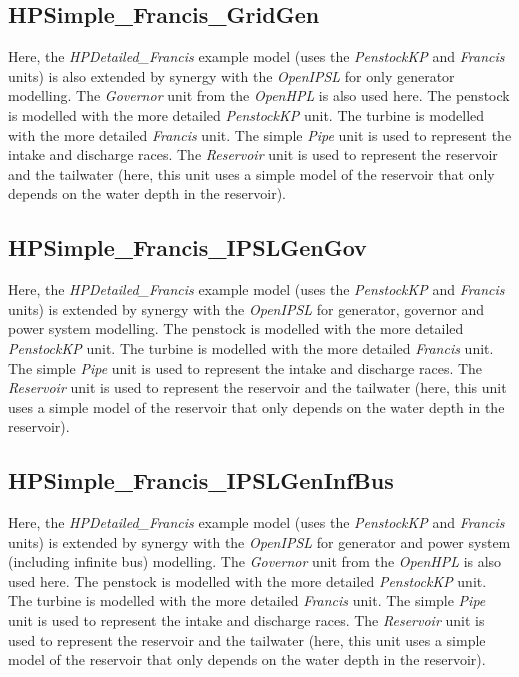 \documentclass[%
]{USN-PhD}
\begin{document}
\subsection{HPSimple\_Francis\_GridGen}

Here, the \emph{HPDetailed\_Francis} example model (uses the \emph{PenstockKP} and \emph{Francis} units) is also extended by synergy with the \emph{OpenIPSL} for only generator modelling. The \emph{Governor} unit from the \emph{OpenHPL} is also used here. The penstock is modelled with the more detailed \emph{PenstockKP} unit. The turbine is modelled with the more detailed \emph{Francis} unit. The simple \emph{Pipe} unit is used to represent the intake and discharge races. The \emph{Reservoir} unit is used to represent the reservoir and the tailwater (here, this unit uses a simple model of the reservoir that only depends on the water depth in the reservoir).

\subsection{HPSimple\_Francis\_IPSLGenGov}

Here, the \emph{HPDetailed\_Francis} example model (uses the \emph{PenstockKP} and \emph{Francis} units) is extended by synergy with the \emph{OpenIPSL} for generator, governor and power system modelling. The penstock is modelled with the more detailed \emph{PenstockKP} unit. The turbine is modelled with the more detailed \emph{Francis} unit. The simple \emph{Pipe} unit is used to represent the intake and discharge races. The \emph{Reservoir} unit is used to represent the reservoir and the tailwater  (here, this unit uses a simple model of the reservoir that only depends on the water depth in the reservoir).

\subsection{HPSimple\_Francis\_IPSLGenInfBus}

Here, the \emph{HPDetailed\_Francis} example model (uses the \emph{PenstockKP} and \emph{Francis} units) is extended by synergy with the \emph{OpenIPSL} for generator and power system (including infinite bus) modelling. The \emph{Governor} unit from the \emph{OpenHPL} is also used here. The penstock is modelled with the more detailed \emph{PenstockKP} unit. The turbine is modelled with the more detailed \emph{Francis} unit. The simple \emph{Pipe} unit is used to represent the intake and discharge races. The \emph{Reservoir} unit is used to represent the reservoir and the tailwater  (here, this unit uses a simple model of the reservoir that only depends on the water depth in the reservoir).
\end{document}
